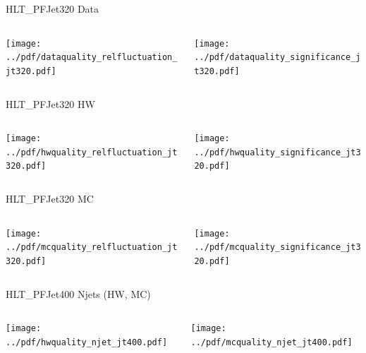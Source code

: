 \documentclass[9pt]{beamer}
\begin{document}
\begin{frame}[t]{HLT\_PFJet320 Data}
\begin{columns}[T]
  \begin{column}{.5\textwidth}
  \texttt{[image: ../pdf/dataquality\_relfluctuation\_jt320.pdf]}
  \end{column}
  \begin{column}{.5\textwidth}
  \texttt{[image: ../pdf/dataquality\_significance\_jt320.pdf]}
  \end{column}
\end{columns}
\end{frame}

\begin{frame}[t]{HLT\_PFJet320 HW}
\begin{columns}[T]
  \begin{column}{.5\textwidth}
  \texttt{[image: ../pdf/hwquality\_relfluctuation\_jt320.pdf]}
  \end{column}
  \begin{column}{.5\textwidth}
  \texttt{[image: ../pdf/hwquality\_significance\_jt320.pdf]}
  \end{column}
\end{columns}
\end{frame}

\begin{frame}[t]{HLT\_PFJet320 MC}
\begin{columns}[T]
  \begin{column}{.5\textwidth}
  \texttt{[image: ../pdf/mcquality\_relfluctuation\_jt320.pdf]}
  \end{column}
  \begin{column}{.5\textwidth}
  \texttt{[image: ../pdf/mcquality\_significance\_jt320.pdf]}
  \end{column}
\end{columns}
\end{frame}

\begin{frame}[t]{HLT\_PFJet400 Njets (HW, MC)}
\begin{columns}[T]
  \begin{column}{.5\textwidth}
  \texttt{[image: ../pdf/hwquality\_njet\_jt400.pdf]}
  \end{column}
  \begin{column}{.5\textwidth}
  \texttt{[image: ../pdf/mcquality\_njet\_jt400.pdf]}
  \end{column}
\end{columns}
\end{frame}
\end{document}

